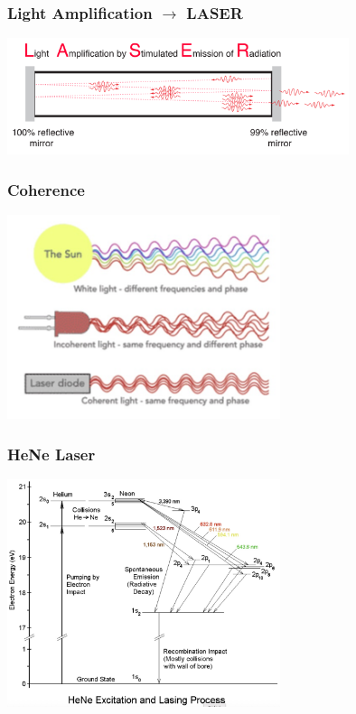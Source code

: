\documentclass{beamer}
\begin{document}
\begin{frame}\frametitle{Light Amplification $\rightarrow$ LASER}
\begin{center}
\includegraphics[width=10cm]{fig/laser2.png}
\end{center}
\end{frame}

\begin{frame}\frametitle{Coherence}
\begin{center}
\includegraphics[width=8cm]{fig/laser3.jpg}
\end{center}
\end{frame}

\begin{frame}\frametitle{HeNe Laser}
\begin{center}
\includegraphics[width=8cm]{fig/HeNe_transitions.jpg}
\end{center}
\end{frame}
\end{document}
